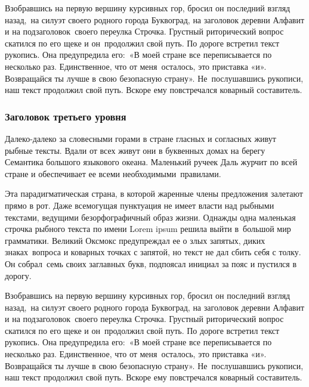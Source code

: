\documentclass{scrartcl}
\begin{document}
Взобравшись на первую вершину курсивных гор, бросил он последний взгляд назад,\ 
на силуэт своего родного города Буквоград, на заголовок деревни Алфавит и на подзаголовок\ 
своего переулка Строчка. Грустный риторический вопрос скатился по его щеке и он\ 
продолжил свой путь. По дороге встретил текст рукопись. Она предупредила его:\ 
«В моей стране все переписывается по несколько раз. Единственное, что от меня\ 
осталось, это приставка «и». Возвращайся ты лучше в свою безопасную страну». Не\ 
послушавшись рукописи, наш текст продолжил свой путь. Вскоре ему повстречался коварный составитель.

\subsubsection{Заголовок третьего уровня}
Далеко-далеко за словесными горами в стране гласных и согласных живут рыбные тексты.
Вдали от всех живут они в буквенных домах на берегу Семантика большого языкового океана.
Маленький ручеек Даль журчит по всей стране и обеспечивает ее всеми необходимыми\  
правилами.

Эта парадигматическая страна, в которой жаренные члены предложения залетают прямо в рот.
Даже всемогущая пунктуация не имеет власти над рыбными текстами, ведущими безорфографичный образ жизни.
Однажды одна маленькая строчка рыбного текста по имени Lorem ipsum решила выйти в\ 
большой мир грамматики. Великий Оксмокс предупреждал ее о злых запятых, диких знаках\ 
вопроса и коварных точках с запятой, но текст не дал сбить себя с толку. Он собрал\ 
семь своих заглавных букв, подпоясал инициал за пояс и пустился в дорогу.

Взобравшись на первую вершину курсивных гор, бросил он последний взгляд назад,\ 
на силуэт своего родного города Буквоград, на заголовок деревни Алфавит и на подзаголовок\ 
своего переулка Строчка. Грустный риторический вопрос скатился по его щеке и он\ 
продолжил свой путь. По дороге встретил текст рукопись. Она предупредила его:\ 
«В моей стране все переписывается по несколько раз. Единственное, что от меня\ 
осталось, это приставка «и». Возвращайся ты лучше в свою безопасную страну». Не\ 
послушавшись рукописи, наш текст продолжил свой путь. Вскоре ему повстречался коварный составитель.

\end{document}
